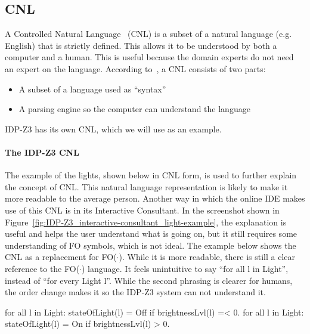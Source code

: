 \documentclass[11pt,a4paper]{report}
\newcommand{\fodot}{FO($\cdot$)\xspace}
\begin{document}
\subsection{CNL}
\label{CNL}
A Controlled Natural Language~\cite{CNL} (CNL) is a subset of a natural language (e.g. English) that is strictly defined. This allows it to be understood by both a computer and a human. This is useful because the domain experts do not need an expert on the language. According to~\cite{CNLAttemptoControlledEnglish}, a CNL consists of two parts:
 \begin{itemize}
 	\item A subset of a language used as ``syntax'' 
     \item A parsing engine so the computer can understand the language
 \end{itemize}
 IDP-Z3 has its own CNL, which we will use as an example.

\paragraph{The IDP-Z3 CNL}
The example of the lights, shown below in CNL form, is used to further explain the concept of CNL. This natural language representation is likely to make it more readable to the average person. Another way in which the online IDE makes use of this CNL is in its Interactive Consultant. In the screenshot shown in Figure~\ref{fig:IDP-Z3_interactive-consultant_light-example}, the explanation is useful and helps the user understand what is going on, but it still requires some understanding of FO symbols, which is not ideal.
The example below shows the CNL as a replacement for \fodot. While it is more readable, there is still a clear reference to the \fodot language. It feels unintuitive to say ``for all l in Light'', instead of ``for every Light l''. While the second phrasing is clearer for humans, the order change makes it so the IDP-Z3 system can not understand it.

\begin{idplisting}
{
for all l in Light: stateOfLight(l) = Off if brightnessLvl(l) =< 0.
for all l in Light: stateOfLight(l) = On if brightnessLvl(l) > 0.
}
\end{idplisting}
\end{document}
